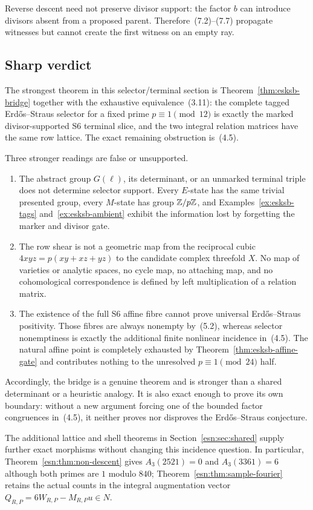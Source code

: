 Reverse descent need not preserve divisor support: the factor \(b\) can
introduce divisors absent from a proposed parent.  Therefore~(7.2)--(7.7)
propagate witnesses but cannot create the first witness on an empty ray.

\subsection{Sharp verdict}

The strongest theorem in this selector/terminal section is
Theorem~\ref{thm:esksb-bridge} together with the exhaustive equivalence~(3.11):
the complete tagged Erd\H{o}s--Straus selector for a fixed prime
\(p\equiv1\pmod {12}\) is exactly the marked divisor-supported S6 terminal
slice, and the two integral relation matrices have the same row lattice.
The exact remaining obstruction is~(4.5).

Three stronger readings are false or unsupported.

\begin{enumerate}
\item The abstract group \(G(\ell)\), its determinant, or an unmarked
terminal triple does not determine selector support.  Every \(E\)-state has
the same trivial presented group, every \(M\)-state has group \(\mathbb Z/p\mathbb Z\),
and Examples~\ref{ex:esksb-tags} and~\ref{ex:esksb-ambient} exhibit the information lost by forgetting
the marker and divisor gate.

\item The row shear is not a geometric map from the reciprocal cubic
\(4xyz=p(xy+xz+yz)\) to the candidate complex threefold \(X\).  No map of
varieties or analytic spaces, no cycle map, no attaching map, and no
cohomological correspondence is defined by left multiplication of a
relation matrix.

\item The existence of the full S6 affine fibre cannot prove universal
Erd\H{o}s--Straus positivity.  Those fibres are always nonempty by~(5.2),
whereas selector nonemptiness is exactly the additional finite nonlinear
incidence in~(4.5).  The natural affine point is completely exhausted by
Theorem~\ref{thm:esksb-affine-gate} and contributes nothing to the unresolved
\(p\equiv1\pmod {24}\) half.
\end{enumerate}

Accordingly, the bridge is a genuine theorem and is stronger than a shared
determinant or a heuristic analogy.  It is also exact enough to prove its own
boundary: without a new argument forcing one of the bounded factor
congruences in~(4.5), it neither proves nor disproves the Erd\H{o}s--Straus
conjecture.

The additional lattice and shell theorems in
Section~\ref{esn:sec:shared} supply further exact morphisms without
changing this incidence question. In particular,
Theorem~\ref{esn:thm:non-descent} gives $A_3(2521)=0$ and
$A_3(3361)=6$ although both primes are $1$ modulo $840$;
Theorem~\ref{esn:thm:sample-fourier} retains the actual counts in the
integral augmentation vector $Q_{R,P}=6W_{R,P}-M_{R,P}u\in N$.
